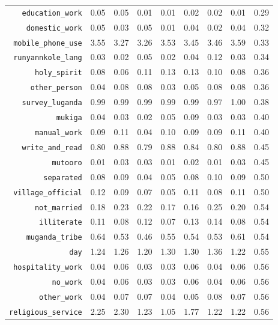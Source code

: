 \begin{longtable}{rrrrrrrrr}
  {\texttt{education\_work}} & 0.05 & 0.05 & 0.01 & 0.01 & 0.02 & 0.02 & 0.01 & 0.29 \\ 
  {\texttt{domestic\_work}} & 0.05 & 0.03 & 0.05 & 0.01 & 0.04 & 0.02 & 0.04 & 0.32 \\ 
  {\texttt{mobile\_phone\_use}} & 3.55 & 3.27 & 3.26 & 3.53 & 3.45 & 3.46 & 3.59 & 0.33 \\ 
  {\texttt{runyannkole\_lang}} & 0.03 & 0.02 & 0.05 & 0.02 & 0.04 & 0.12 & 0.03 & 0.34 \\ 
  {\texttt{holy\_spirit}} & 0.08 & 0.06 & 0.11 & 0.13 & 0.13 & 0.10 & 0.08 & 0.36 \\ 
  {\texttt{other\_person}} & 0.04 & 0.08 & 0.08 & 0.03 & 0.05 & 0.08 & 0.08 & 0.36 \\ 
  {\texttt{survey\_luganda}} & 0.99 & 0.99 & 0.99 & 0.99 & 0.99 & 0.97 & 1.00 & 0.38 \\ 
  {\texttt{mukiga}} & 0.04 & 0.03 & 0.02 & 0.05 & 0.09 & 0.03 & 0.03 & 0.40 \\ 
  {\texttt{manual\_work}} & 0.09 & 0.11 & 0.04 & 0.10 & 0.09 & 0.09 & 0.11 & 0.40 \\ 
  {\texttt{write\_and\_read}} & 0.80 & 0.88 & 0.79 & 0.88 & 0.84 & 0.80 & 0.88 & 0.45 \\ 
  {\texttt{mutooro}} & 0.01 & 0.03 & 0.03 & 0.01 & 0.02 & 0.01 & 0.03 & 0.45 \\ 
  {\texttt{separated}} & 0.08 & 0.09 & 0.04 & 0.05 & 0.08 & 0.10 & 0.09 & 0.50 \\ 
  {\texttt{village\_official}} & 0.12 & 0.09 & 0.07 & 0.05 & 0.11 & 0.08 & 0.11 & 0.50 \\ 
  {\texttt{not\_married}} & 0.18 & 0.23 & 0.22 & 0.17 & 0.16 & 0.25 & 0.20 & 0.54 \\ 
  {\texttt{illiterate}} & 0.11 & 0.08 & 0.12 & 0.07 & 0.13 & 0.14 & 0.08 & 0.54 \\ 
  {\texttt{muganda\_tribe}} & 0.64 & 0.53 & 0.46 & 0.55 & 0.54 & 0.53 & 0.61 & 0.54 \\ 
  {\texttt{day}} & 1.24 & 1.26 & 1.20 & 1.30 & 1.30 & 1.36 & 1.22 & 0.55 \\ 
  {\texttt{hospitality\_work}} & 0.04 & 0.06 & 0.03 & 0.03 & 0.06 & 0.04 & 0.06 & 0.56 \\ 
  {\texttt{no\_work}} & 0.04 & 0.06 & 0.03 & 0.03 & 0.06 & 0.04 & 0.06 & 0.56 \\ 
  {\texttt{other\_work}} & 0.04 & 0.07 & 0.07 & 0.04 & 0.05 & 0.08 & 0.07 & 0.56 \\ 
  {\texttt{religious\_service}} & 2.25 & 2.30 & 1.23 & 1.05 & 1.77 & 1.22 & 1.22 & 0.56 \\ 

\end{longtable}

